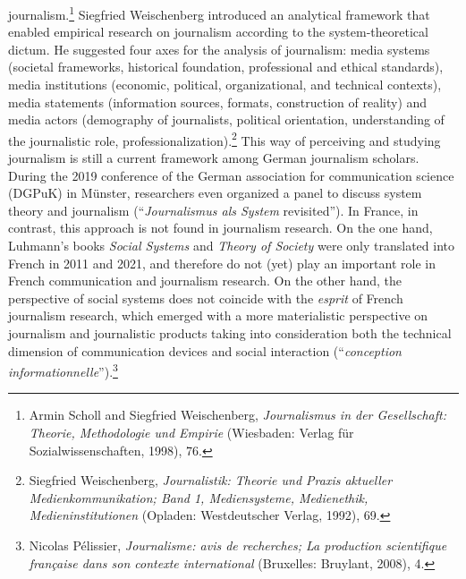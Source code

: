 \documentclass{tufte-handout}
\begin{document}
journalism.\footnote{Armin Scholl and Siegfried Weischenberg,
  \emph{Journalismus in der Gesellschaft: Theorie, Methodologie und
  Empirie} (Wiesbaden: Verlag für Sozialwissenschaften, 1998), 76.}
Siegfried Weischenberg introduced an analytical framework that enabled
empirical research on journalism according to the system-theoretical
dictum. He suggested four axes for the analysis of journalism: media
systems (societal frameworks, historical foundation, professional and
ethical standards), media institutions (economic, political,
organizational, and technical contexts), media statements (information
sources, formats, construction of reality) and media actors (demography
of journalists, political orientation, understanding of the journalistic
role, professionalization).\footnote{Siegfried Weischenberg,
  \emph{Journalistik: Theorie und Praxis aktueller Medienkommunikation;
  Band 1, Mediensysteme, Medienethik, Medieninstitutionen} (Opladen:
  Westdeutscher Verlag, 1992), 69.} This way of perceiving and studying
journalism is still a current framework among German journalism
scholars. During the 2019 conference of the German association for
communication science (DGPuK) in Münster, researchers even organized a
panel to discuss system theory and journalism (``\emph{Journalismus als
System} revisited''). In France, in contrast, this approach is not found
in journalism research. On the one hand, Luhmann's books \emph{Social
Systems} and \emph{Theory of Society} were only translated into French
in 2011 and 2021, and therefore do not (yet) play an important role in
French communication and journalism research. On the other hand, the
perspective of social systems does not coincide with the \emph{esprit}
of French journalism research, which emerged with a more materialistic
perspective on journalism and journalistic products taking into
consideration both the technical dimension of communication devices and
social interaction (``\emph{conception informationnelle}'').\footnote{Nicolas
  Pélissier, \emph{Journalisme: avis de recherches; La production
  scientifique française dans son contexte international} (Bruxelles:
  Bruylant, 2008), 4.}
\end{document}
